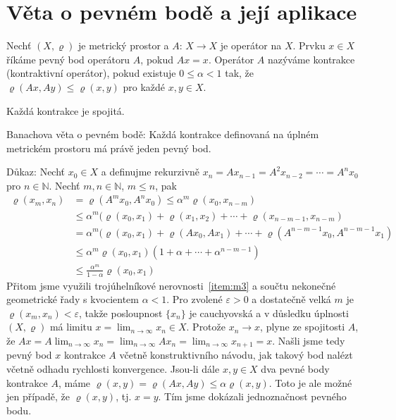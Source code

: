 \section{Věta o pevném bodě a její aplikace}

Nechť $(X,\varrho)$ je metrický prostor a $A:\,X\rightarrow X$ je operátor na $X$.
Prvku $x\in X$ říkáme pevný bod operátoru $A$, pokud $Ax=x$.
Operátor $A$ nazýváme kontrakce (kontraktivní operátor), pokud existuje
$0\leq \alpha <1$ tak, že $\varrho(Ax,Ay)\leq\varrho(x,y)$ pro každé $x,y\in X$.

Každá kontrakce je spojitá.

Banachova věta o pevném bodě:
Každá kontrakce definovaná na úplném metrickém prostoru má právě jeden pevný bod.

Důkaz: Nechť $x_0\in X$ a definujme rekurzivně 
$x_n=Ax_{n-1}=A^2x_{n-2}=\cdots=A^nx_0$ pro $n\in\mathbb{N}$.
Nechť $m,n\in\mathbb{N}$, $m\leq n$, pak
\[
   \begin{split}
      \varrho(x_m,x_n)&=\varrho(A^mx_0,A^nx_0)\leq\alpha^m\varrho(x_0,x_{n-m})\\
                      &\leq\alpha^m(\varrho(x_0,x_1)+\varrho(x_1,x_2)+\cdots
                       +\varrho(x_{n-m-1},x_{n-m})\\
                      &=\alpha^m(\varrho(x_0,x_1)+\varrho(Ax_0,Ax_1)+\cdots
                       +\varrho(A^{n-m-1}x_0,A^{n-m-1}x_1)\\
                      &\leq\alpha^m\varrho(x_0,x_1)(1+\alpha+\cdots
                       +\alpha^{n-m-1})\\
                      &\leq\frac{\alpha^m}{1-\alpha}\varrho(x_0,x_1)
   \end{split}
\]
Přitom jsme využili trojúhelníkové nerovnosti~\ref{item:m3}
a součtu nekonečné geometrické řady s kvocientem $\alpha<1$.
Pro zvolené $\varepsilon>0$ a dostatečně velká $m$ je $\varrho(x_m,x_n)<\varepsilon$,
takže posloupnost $\{x_n\}$ je cauchyovská a v důsledku úplnosti $(X,\varrho)$
má limitu $x=\lim_{n\rightarrow\infty}x_n\in X$.
Protože $x_n\rightarrow x$, plyne ze spojitosti $A$, že
$Ax=A\lim_{n\rightarrow\infty}x_n=\lim_{n\rightarrow\infty}Ax_n
=\lim_{n\rightarrow\infty}x_{n+1}=x$.
Našli jsme tedy pevný bod $x$ kontrakce $A$ včetně konstruktivního návodu,
jak takový bod nalézt včetně odhadu rychlosti konvergence.
Jsou-li dále $x,y\in X$ dva pevné body kontrakce $A$, máme
$\varrho(x,y)=\varrho(Ax,Ay)\leq\alpha\varrho(x,y)$.
Toto je ale možné jen případě, že $\varrho(x,y)$, tj. $x=y$.
Tím jsme dokázali jednoznačnost pevného bodu.

